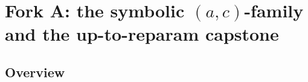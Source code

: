 \chapter{Fork A: the symbolic \texorpdfstring{$(a,c)$}{(a,c)}-family and the up-to-reparam capstone}
\label{chap:hyperbolic_family}


\section{Overview}

